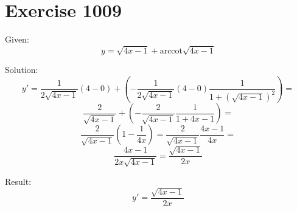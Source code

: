 \documentclass[a4paper, 10pt]{scrartcl}
\newcommand*\arccot{\mathrm{arccot}}
\begin{document}
\section{Exercise 1009}

Given:
\[
y = \sqrt{4x - 1} + \arccot{\sqrt{4x - 1}}
\]

Solution:
\[
y' = \frac{1}{2\sqrt{4x - 1}}(4 - 0) + \left(-\frac{1}{2\sqrt{4x - 1}}(4 - 0)\frac{1}{1 + (\sqrt{4x - 1})^{2}}\right) =
\]
\[
\frac{2}{\sqrt{4x - 1}} + \left(-\frac{2}{\sqrt{4x - 1}}\frac{1}{1 + 4x - 1}\right) =
\]
\[
\frac{2}{\sqrt{4x - 1}}\left(1 - \frac{1}{4x}\right) = \frac{2}{\sqrt{4x - 1}}\frac{4x - 1}{4x} =
\]
\[
\frac{4x - 1}{2x\sqrt{4x - 1}} = \frac{\sqrt{4x - 1}}{2x}
\]

Result:
\[
y' = \frac{\sqrt{4x - 1}}{2x}
\]
\end{document}
